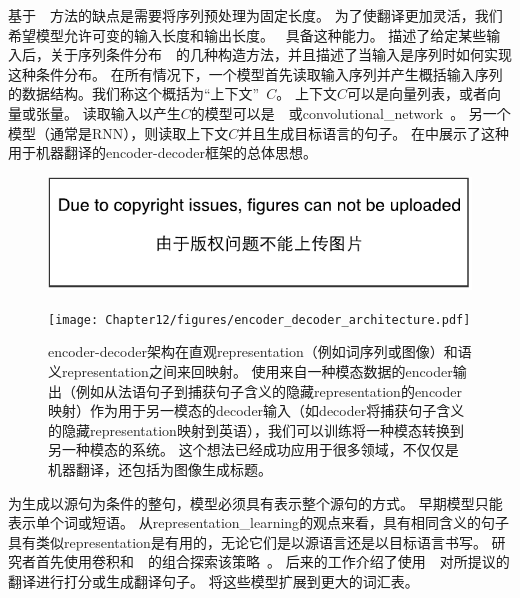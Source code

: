 基于~~方法的缺点是需要将序列预处理为固定长度。
为了使翻译更加灵活，我们希望模型允许可变的输入长度和输出长度。
~具备这种能力。
描述了给定某些输入后，关于序列条件分布~~的几种构造方法，并且描述了当输入是序列时如何实现这种条件分布。
在所有情况下，一个模型首先读取输入序列并产生概括输入序列的数据结构。我们称这个概括为``上下文''~$C$。
上下文$C$可以是向量列表，或者向量或张量。
读取输入以产生$C$的模型可以是~~\citep{Cho-et-al-EMNLP2014,Sutskever-et-al-NIPS2014,Jean-et-al-arxiv2014}或\gls{convolutional_network}~\citep{Kalchbrenner+Blunsom-EMNLP2013}。
另一个模型（通常是RNN），则读取上下文$C$并且生成目标语言的句子。
在中展示了这种用于机器翻译的\gls{encoder}-\gls{decoder}框架的总体思想。


\begin{figure}[htp]
\ifOpenSource
\centerline{\includegraphics{figure.pdf}}
\else
\centerline{\texttt{[image: Chapter12/figures/encoder\_decoder\_architecture.pdf]}}
\fi
\caption{\gls{encoder}-\gls{decoder}架构在直观\gls{representation}（例如词序列或图像）和语义\gls{representation}之间来回映射。
使用来自一种模态数据的\gls{encoder}输出（例如从法语句子到捕获句子含义的隐藏\gls{representation}的\gls{encoder}映射）作为用于另一模态的\gls{decoder}输入（如\gls{decoder}将捕获句子含义的隐藏\gls{representation}映射到英语），我们可以训练将一种模态转换到另一种模态的系统。
这个想法已经成功应用于很多领域，不仅仅是机器翻译，还包括为图像生成标题。
}
\label{fig:chap12_encoder_decoder_architecture}
\end{figure}

为生成以源句为条件的整句，模型必须具有表示整个源句的方式。 
早期模型只能表示单个词或短语。
从\gls{representation_learning}的观点来看，具有相同含义的句子具有类似\gls{representation}是有用的，无论它们是以源语言还是以目标语言书写。
研究者首先使用卷积和~~的组合探索该策略~\citep{Kalchbrenner+Blunsom-EMNLP2013}。
后来的工作介绍了使用~~对所提议的翻译进行打分\citep{Cho-et-al-EMNLP2014}或生成翻译句子\citep{Sutskever-et-al-NIPS2014}。
\cite{Jean-et-al-arxiv2014}将这些模型扩展到更大的词汇表。

